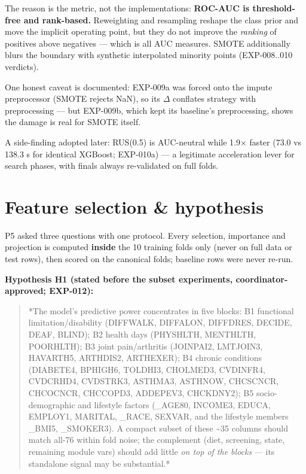 \documentclass[11pt,a4paper]{article}
\begin{document}
The reason is the metric, not the implementations: \textbf{ROC-AUC is
threshold-free and rank-based.} Reweighting and resampling reshape the
class prior and move the implicit operating point, but they do not
improve the \emph{ranking} of positives above negatives --- which is all
AUC measures. SMOTE additionally blurs the boundary with synthetic
interpolated minority points (EXP-008..010 verdicts).

One honest caveat is documented: EXP-009a was forced onto the impute
preprocessor (SMOTE rejects NaN), so its $\Delta$ conflates strategy with
preprocessing --- but EXP-009b, which kept its baseline's preprocessing,
shows the damage is real for SMOTE itself.

A side-finding adopted later: RUS(0.5) is AUC-neutral while 1.9$\times$ faster
(73.0 vs 138.3 s for identical XGBoost; EXP-010a) --- a legitimate
acceleration lever for search phases, with finals always re-validated on
full folds.

\section{Feature selection \&
hypothesis}\label{feature-selection-hypothesis}

P5 asked three questions with one protocol. Every selection, importance
and projection is computed \textbf{inside} the 10 training folds only
(never on full data or test rows), then scored on the canonical folds;
baseline rows were never re-run.

\textbf{Hypothesis H1 (stated before the subset experiments,
coordinator-approved; EXP-012):}

\begin{quote}
*The model's predictive power concentrates in five blocks: B1 functional
limitation/disability (DIFFWALK, DIFFALON, DIFFDRES, DECIDE, DEAF,
BLIND); B2 health days (PHYSHLTH, MENTHLTH, POORHLTH); B3 joint
pain/arthritis (JOINPAI2, LMTJOIN3, HAVARTH5, ARTHDIS2, ARTHEXER); B4
chronic conditions (DIABETE4, BPHIGH6, TOLDHI3, CHOLMED3, CVDINFR4,
CVDCRHD4, CVDSTRK3, ASTHMA3, ASTHNOW, CHCSCNCR, CHCOCNCR, CHCCOPD3,
ADDEPEV3, CHCKDNY2); B5 socio-demographic and lifestyle factors
(\_AGE80, INCOME3, EDUCA, EMPLOY1, MARITAL, \_RACE, SEXVAR, and the
lifestyle members \_BMI5, \_SMOKER3). A compact subset of these
\textasciitilde35 columns should match all-76 within fold noise; the
complement (diet, screening, state, remaining module vars) should add
little \emph{on top of the blocks} --- its standalone signal may be
substantial.*
\end{quote}
\end{document}
